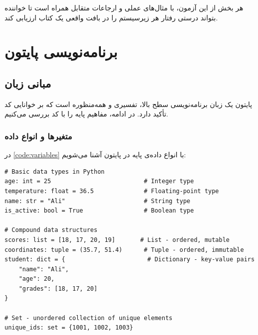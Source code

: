 \documentclass{matinbook}
\begin{document}
هر بخش از این آزمون، با مثال‌های عملی و ارجاعات متقابل
همراه است تا خواننده بتواند درستی رفتار هر زیرسیستم را
در بافت واقعی یک کتاب ارزیابی کند.

\clearpage

\tableofcontents
\clearpage

\listoffigures
\clearpage

\listoftables
\clearpage

\mainmatter
\mainmattergeometry

\chapter{برنامه‌نویسی پایتون}
\label{chap:python}

\section{مبانی زبان}
\label{sec:python-basics}

پایتون یک زبان برنامه‌نویسی سطح بالا،
تفسیری و همه‌منظوره است که بر خوانایی کد تأکید دارد.
در ادامه، مفاهیم پایه را با کد بررسی می‌کنیم.


\subsection{متغیرها و انواع داده}
\label{sec:python-variables}

در \cref{code:variables} با انواع داده‌ی پایه در پایتون
آشنا می‌شویم:

\begin{latin}
\begin{verbatim}
# Basic data types in Python
age: int = 25                          # Integer type
temperature: float = 36.5              # Floating-point type
name: str = "Ali"                      # String type
is_active: bool = True                 # Boolean type

# Compound data structures
scores: list = [18, 17, 20, 19]       # List - ordered, mutable
coordinates: tuple = (35.7, 51.4)      # Tuple - ordered, immutable
student: dict = {                       # Dictionary - key-value pairs
    "name": "Ali",
    "age": 20,
    "grades": [18, 17, 20]
}

# Set - unordered collection of unique elements
unique_ids: set = {1001, 1002, 1003}
\end{verbatim}
\end{latin}
\label{code:variables}
\end{document}
